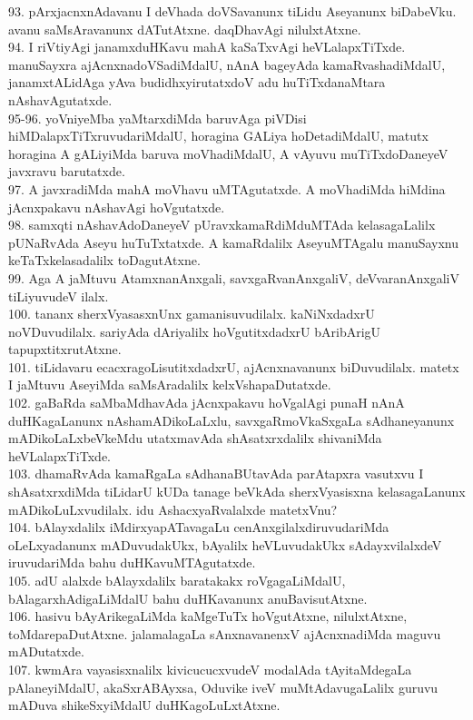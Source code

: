 \documentclass{article}
\begin{document}
93. pArxjacnxnAdavanu I deVhada doVSavanunx tiLidu Aseyanunx biDabeVku. avanu saMsAravanunx dATutAtxne. daqDhavAgi nilulxtAtxne.\\
94. I riVtiyAgi janamxduHKavu mahA kaSaTxvAgi heVLalapxTiTxde. manuSayxra ajAcnxnadoVSadiMdalU, nAnA bageyAda kamaRvashadiMdalU, janamxtALidAga yAva budidhxyirutatxdoV adu huTiTxdanaMtara nAshavAgutatxde.\\
95-96. yoVniyeMba yaMtarxdiMda baruvAga piVDisi hiMDalapxTiTxruvudariMdalU, horagina GALiya hoDetadiMdalU, matutx horagina A gALiyiMda baruva moVhadiMdalU, A vAyuvu muTiTxdoDaneyeV javxravu barutatxde.\\
97. A javxradiMda mahA moVhavu uMTAgutatxde. A moVhadiMda hiMdina jAcnxpakavu nAshavAgi hoVgutatxde.\\
98. samxqti nAshavAdoDaneyeV pUravxkamaRdiMduMTAda kelasagaLalilx pUNaRvAda Aseyu huTuTxtatxde. A kamaRdalilx AseyuMTAgalu manuSayxnu keTaTxkelasadalilx toDagutAtxne.\\
99. Aga A jaMtuvu AtamxnanAnxgali, savxgaRvanAnxgaliV, deVvaranAnxgaliV tiLiyuvudeV ilalx.\\
100. tananx sherxVyasasxnUnx gamanisuvudilalx. kaNiNxdadxrU noVDuvudilalx. sariyAda dAriyalilx hoVgutitxdadxrU bAribArigU tapupxtitxrutAtxne.\\
101. tiLidavaru ecacxragoLisutitxdadxrU, ajAcnxnavanunx biDuvudilalx. matetx I jaMtuvu AseyiMda saMsAradalilx kelxVshapaDutatxde.\\
102. gaBaRda saMbaMdhavAda jAcnxpakavu hoVgalAgi punaH nAnA duHKagaLanunx nAshamADikoLaLxlu, savxgaRmoVkaSxgaLa sAdhaneyanunx mADikoLaLxbeVkeMdu utatxmavAda shAsatxrxdalilx shivaniMda heVLalapxTiTxde.\\
103. dhamaRvAda kamaRgaLa sAdhanaBUtavAda parAtapxra vasutxvu I shAsatxrxdiMda tiLidarU kUDa tanage beVkAda sherxVyasisxna kelasagaLanunx mADikoLuLxvudilalx. idu AshacxyaRvalalxde matetxVnu?\\
104. bAlayxdalilx iMdirxyapATavagaLu cenAnxgilalxdiruvudariMda oLeLxyadanunx mADuvudakUkx, bAyalilx heVLuvudakUkx sAdayxvilalxdeV iruvudariMda bahu duHKavuMTAgutatxde.\\
105. adU alalxde bAlayxdalilx baratakakx roVgagaLiMdalU, bAlagarxhAdigaLiMdalU bahu duHKavanunx anuBavisutAtxne.\\
106. hasivu bAyArikegaLiMda kaMgeTuTx hoVgutAtxne, nilulxtAtxne, toMdarepaDutAtxne. jalamalagaLa sAnxnavanenxV ajAcnxnadiMda maguvu mADutatxde.\\
107. kwmAra vayasisxnalilx kivicucucxvudeV modalAda tAyitaMdegaLa pAlaneyiMdalU, akaSxrABAyxsa, Oduvike iveV muMtAdavugaLalilx guruvu mADuva shikeSxyiMdalU duHKagoLuLxtAtxne.\\
\end{document}

